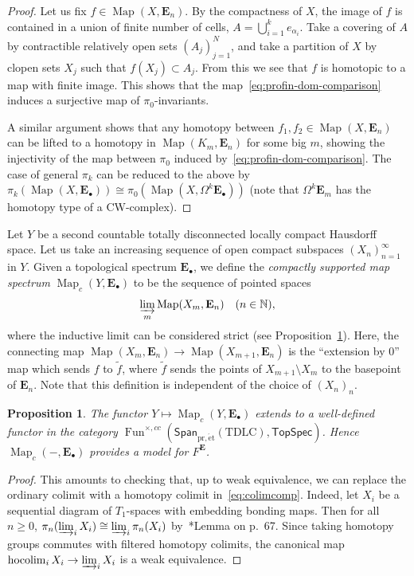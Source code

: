 \documentclass[a4paper,reqno]{amsart}
\theoremstyle{plain}
\newtheorem{proposition}[theorem]{Proposition}
\theoremstyle{definition}
\theoremstyle{remark}
\numberwithin{equation}{section}
\newcommand{\dN}{\mathbb{N}}
\newcommand{\bE}{\mathbf{E}}
\newcommand{\TopSpec}{\mathsf{TopSpec}}
\newcommand{\Span}{\mathsf{Span}}
\DeclareMathOperator*{\hocolim}{hocolim}
\newcommand{\pret}{\mathrm{pr,\acute{e}t}}
\newcommand{\TDLC}{\mathrm{TDLC}}
\DeclareMathOperator{\Fun}{Fun}
\DeclareMathOperator{\Map}{Map}
\begin{document}
\begin{proof}
Let us fix $f \in \Map(X, \bE_n)$.
By the compactness of $X$, the image of $f$ is contained in a union of finite number of cells, $A = \bigcup_{i = 1}^k e_{\alpha_i}$.
Take a covering of $A$ by contractible relatively open sets $(A_j)_{j = 1}^N$, and take a partition of $X$ by clopen sets $X_j$ such that $f(X_j) \subset A_j$.
From this we see that $f$ is homotopic to a map with finite image.
This shows that the map~\eqref{eq:profin-dom-comparison} induces a surjective map of $\pi_0$-invariants.

A similar argument shows that any homotopy between $f_1, f_2 \in \Map(X, \bE_n)$ can be lifted to a homotopy in $\Map(K_m, \bE_n)$ for some big $m$, showing the injectivity of the map between $\pi_0$ induced by~\eqref{eq:profin-dom-comparison}.
The case of general $\pi_k$ can be reduced to the above by $\pi_k( \Map(X, \bE_\bullet))\cong \pi_0(\Map(X,\Omega^k\bE_\bullet))$ (note that $\Omega^k\bE_m$ has the homotopy type of a CW-complex).
\end{proof}

Let $Y$ be a second countable totally disconnected locally compact Hausdorff space.
Let us take an increasing sequence of open compact subspaces $(X_n)_{n = 1}^\infty$ in $Y$.
Given a topological spectrum $\bE_\bullet$, we define the \emph{compactly supported map spectrum} $\Map_c(Y, \bE_\bullet)$ to be the sequence of pointed spaces
\begin{equation}\label{eq:colimcomp}
\varinjlim_m \Map(X_m, \bE_n) \quad (n \in \dN),
\end{equation}
where the inductive limit can be considered strict (see Proposition~\ref{prop:trans-fun-spec}). Here, the connecting map $\Map(X_m, \bE_n) \to \Map(X_{m + 1}, \bE_n)$ is the ``extension by $0$'' map which sends $f$ to $\tilde{f}$, where $\tilde{f}$ sends the points of $X_{m + 1} \setminus X_m$ to the basepoint of $\bE_n$.
Note that this definition is independent of the choice of $(X_n)_n$.

\begin{proposition}\label{prop:trans-fun-spec}
The functor $Y \mapsto \Map_c(Y, \bE_\bullet)$ extends to a well-defined functor in the category $\Fun^{\times, cc}(\Span_{\pret}(\TDLC), \TopSpec)$. Hence $\Map_c(-, \bE_\bullet)$ provides a model for $F^{\bE}$.
\end{proposition}

\begin{proof}
This amounts to checking that, up to weak equivalence, we can replace the ordinary colimit with a homotopy colimit in~\eqref{eq:colimcomp}. Indeed, let $X_i$ be a sequential diagram of $T_1$-spaces with embedding bonding maps. Then for all $n\geq 0$, $\pi_n(\varinjlim_i X_i)\cong \varinjlim_i \pi_n(X_i)$ by~\cite{may:concise}*{Lemma on p.~67}. Since taking homotopy groups commutes with filtered homotopy colimits, the canonical map $\hocolim_i X_i \to \varinjlim_i X_i$ is a weak equivalence.
\end{proof}
\end{document}
